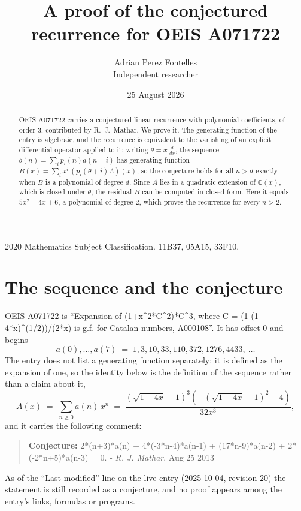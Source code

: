 \documentclass[11pt,a4paper]{article}
\title{A proof of the conjectured recurrence for OEIS A071722}
\author{Adrian Perez Fontelles\\ \small Independent researcher}
\date{25 August 2026}
\theoremstyle{plain}
\theoremstyle{definition}
\begin{document}
\maketitle

\begin{abstract}
OEIS A071722 carries a conjectured linear recurrence with polynomial coefficients, of
order 3, contributed by R.~J.~Mathar. We prove it. The generating function of the
entry is algebraic, and the recurrence is equivalent to the vanishing of an explicit
differential operator applied to it: writing $\theta=x\,\frac{d}{dx}$, the sequence
$b(n)=\sum_{i}p_{i}(n)a(n-i)$ has generating function
$B(x)=\sum_{i}x^{i}\,(p_{i}(\theta+i)A)(x)$, so the conjecture holds for all $n>d$ exactly
when $B$ is a polynomial of degree $d$. Since $A$ lies in a quadratic extension of
$\mathbb{Q}(x)$, which is closed under $\theta$, the residual $B$ can be computed in
closed form. Here it equals $5 x^{2} - 4 x + 6$, a polynomial of degree $2$, which proves
the recurrence for every $n>2$.
\end{abstract}

\noindent\small 2020 Mathematics Subject Classification. 11B37, 05A15, 33F10.\normalsize

\section{The sequence and the conjecture}

OEIS A071722 is ``Expansion of (1+x\^{}2*C\^{}2)*C\^{}3, where C = (1-(1-4*x)\^{}(1/2))/(2*x) is g.f. for Catalan numbers, A000108''. It has offset $0$ and begins
\[
a(0),\dots,a(7)\;=\;1, 3, 10, 33, 110, 372, 1276, 4433,\ \dots
\]
The entry does not list a generating function separately: it is defined as the
expansion of one, so the identity below is the definition of the sequence rather than a
claim about it,
\begin{equation}\label{eq:gf}
A(x)\;=\;\sum_{n\ge 0} a(n)\,x^{n}\;=\;\frac{\left(\sqrt{1 - 4 x} - 1\right)^{3} \left(- \left(\sqrt{1 - 4 x} - 1\right)^{2} - 4\right)}{32 x^{3}} ,
\end{equation}
and it carries the following comment:
\begin{quote}\small
\textbf{Conjecture:} 2*(n+3)*a(n) + 4*(-3*n-4)*a(n-1) + (17*n-9)*a(n-2) + 2*(-2*n+5)*a(n-3) = 0. - \emph{R. J. Mathar}, Aug 25 2013
\end{quote}
As of the ``Last modified'' line on the live entry (2025-10-04, revision 20) the
statement is still recorded as a conjecture, and no proof appears among the entry's links,
formulas or programs.
\end{document}
